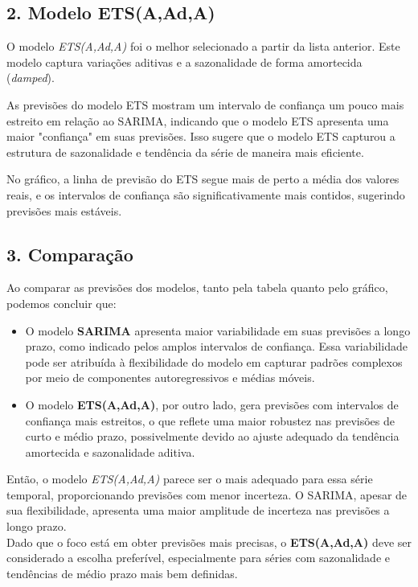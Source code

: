 \documentclass[a4paper, 12pt]{article}
\begin{document}
\subsection*{2. Modelo ETS(A,Ad,A)}
O modelo \textit{ETS(A,Ad,A)} foi o melhor selecionado a partir da lista anterior. Este modelo captura variações aditivas e a sazonalidade de forma amortecida (\textit{damped}). 

As previsões do modelo ETS mostram um intervalo de confiança um pouco mais estreito em relação ao SARIMA, indicando que o modelo ETS apresenta uma maior "confiança" em suas previsões. Isso sugere que o modelo ETS capturou a estrutura de sazonalidade e tendência da série de maneira mais eficiente.

No gráfico, a linha de previsão do ETS segue mais de perto a média dos valores reais, e os intervalos de confiança são significativamente mais contidos, sugerindo previsões mais estáveis.

\subsection*{3. Comparação}
Ao comparar as previsões dos modelos, tanto pela tabela quanto pelo gráfico, podemos concluir que:

\begin{itemize}
    \item O modelo \textbf{SARIMA} apresenta maior variabilidade em suas previsões a longo prazo, como indicado pelos amplos intervalos de confiança. Essa variabilidade pode ser atribuída à flexibilidade do modelo em capturar padrões complexos por meio de componentes autoregressivos e médias móveis.
    
    \item O modelo \textbf{ETS(A,Ad,A)}, por outro lado, gera previsões com intervalos de confiança mais estreitos, o que reflete uma maior robustez nas previsões de curto e médio prazo, possivelmente devido ao ajuste adequado da tendência amortecida e sazonalidade aditiva.
\end{itemize}

Então, o modelo \textit{ETS(A,Ad,A)} parece ser o mais adequado para essa série temporal, proporcionando previsões com menor incerteza. O SARIMA, apesar de sua flexibilidade, apresenta uma maior amplitude de incerteza nas previsões a longo prazo.\\

Dado que o foco está em obter previsões mais precisas, o \textbf{ETS(A,Ad,A)} deve ser considerado a escolha preferível, especialmente para séries com sazonalidade e tendências de médio prazo mais bem definidas.

\newpage
\end{document}
